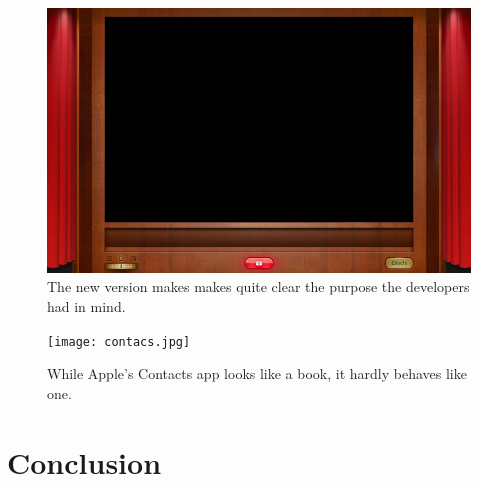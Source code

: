 \documentclass{article}
\begin{document}
\begin{figure}
\centering
\includegraphics[width=5in]{photoboothFullscreenSmall.jpg}
\caption{The new version makes makes quite clear the purpose the developers had in mind.}
\label{New Photo Booth}
\end{figure}

\begin{figure}
\centering
\texttt{[image: contacs.jpg]}
\caption{While Apple's Contacts app looks like a book, it hardly behaves like one.}
\label{Contacts}
\end{figure}



\section{Conclusion}




\end{document}
